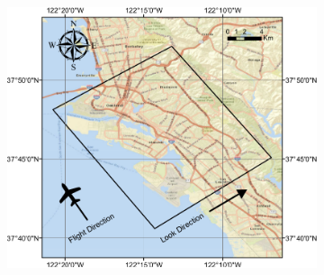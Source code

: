 \begin{figure}
	\centering
	\begin{subfigure}[t]{0.825\columnwidth}
	\centering
	\includegraphics[width =\columnwidth]{Figures/Map} \quad
	\vspace{-10pt}
	\caption{}
 	\end{subfigure}%

\vspace{5pt}


\end{figure}
